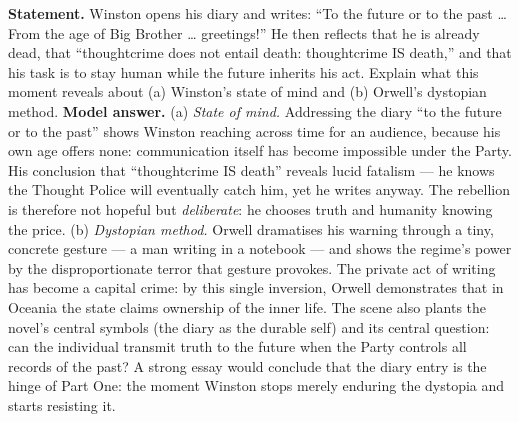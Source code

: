 \documentclass[11pt]{article}
\begin{document}
\begin{exoresolu}
\textbf{Statement.} Winston opens his diary and writes: ``To the future or to the past \ldots{} From the age of Big Brother \ldots{} greetings!'' He then reflects that he is already dead, that ``thoughtcrime does not entail death: thoughtcrime IS death,'' and that his task is to stay human while the future inherits his act. Explain what this moment reveals about (a) Winston's state of mind and (b) Orwell's dystopian method.
\tcblower
\textbf{Model answer.} (a) \emph{State of mind.} Addressing the diary ``to the future or to the past'' shows Winston reaching across time for an audience, because his own age offers none: communication itself has become impossible under the Party. His conclusion that ``thoughtcrime IS death'' reveals lucid fatalism --- he knows the Thought Police will eventually catch him, yet he writes anyway. The rebellion is therefore not hopeful but \emph{deliberate}: he chooses truth and humanity knowing the price. (b) \emph{Dystopian method.} Orwell dramatises his warning through a tiny, concrete gesture --- a man writing in a notebook --- and shows the regime's power by the disproportionate terror that gesture provokes. The private act of writing has become a capital crime: by this single inversion, Orwell demonstrates that in Oceania the state claims ownership of the inner life. The scene also plants the novel's central symbols (the diary as the durable self) and its central question: can the individual transmit truth to the future when the Party controls all records of the past? A strong essay would conclude that the diary entry is the hinge of Part One: the moment Winston stops merely enduring the dystopia and starts resisting it.
\end{exoresolu}
\end{document}
